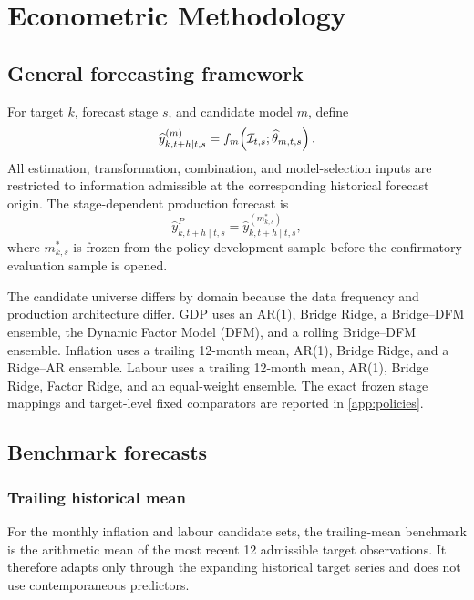 \section{Econometric Methodology}
\label{sec:methodology}

\subsection{General forecasting framework}
\label{subsec:general_framework}

For target \(k\), forecast stage \(s\), and candidate model \(m\), define
\begin{equation}
    \widehat{y}_{k,t+h\mid t,s}^{(m)}
    =
    f_m\!\left(\mathcal{I}_{t,s};\widehat{\theta}_{m,t,s}\right).
    \label{eq:general_forecast}
\end{equation}
All estimation, transformation, combination, and model-selection inputs are
restricted to information admissible at the corresponding historical forecast
origin. The stage-dependent production forecast is
\begin{equation}
    \widehat{y}_{k,t+h\mid t,s}^{P}
    =
    \widehat{y}_{k,t+h\mid t,s}^{\left(m^*_{k,s}\right)},
    \label{eq:production_forecast}
\end{equation}
where \(m^*_{k,s}\) is frozen from the policy-development sample before the
confirmatory evaluation sample is opened.

The candidate universe differs by domain because the data frequency and
production architecture differ. GDP uses an AR(1), Bridge Ridge, a
Bridge--DFM ensemble, the Dynamic Factor Model (DFM), and a rolling
Bridge--DFM ensemble. Inflation uses a trailing 12-month mean, AR(1), Bridge
Ridge, and a Ridge--AR ensemble. Labour uses a trailing 12-month mean, AR(1),
Bridge Ridge, Factor Ridge, and an equal-weight ensemble. The exact frozen
stage mappings and target-level fixed comparators are reported in
\ref{app:policies}.

\subsection{Benchmark forecasts}
\label{subsec:benchmarks}

\subsubsection{Trailing historical mean}

For the monthly inflation and labour candidate sets, the trailing-mean
benchmark is the arithmetic mean of the most recent 12 admissible target
observations. It therefore adapts only through the expanding historical target
series and does not use contemporaneous predictors.

